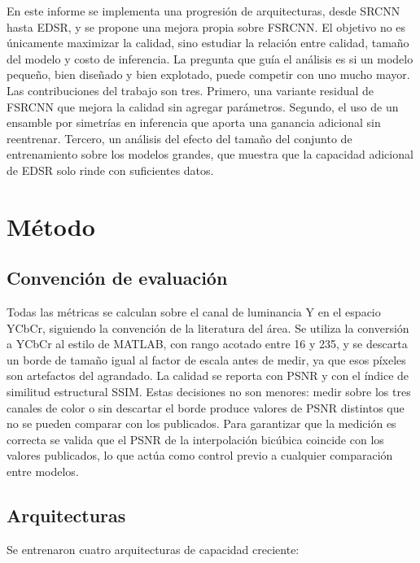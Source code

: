 \documentclass[conference]{IEEEtran}
\begin{document}
En este informe se implementa una progresión de arquitecturas, desde SRCNN hasta EDSR, y se
propone una mejora propia sobre FSRCNN. El objetivo no es únicamente maximizar la calidad, sino
estudiar la relación entre calidad, tamaño del modelo y costo de inferencia. La pregunta que
guía el análisis es si un modelo pequeño, bien diseñado y bien explotado, puede competir con uno
mucho mayor. Las contribuciones del trabajo son tres. Primero, una variante residual de FSRCNN
que mejora la calidad sin agregar parámetros. Segundo, el uso de un ensamble por simetrías en
inferencia que aporta una ganancia adicional sin reentrenar. Tercero, un análisis del efecto del
tamaño del conjunto de entrenamiento sobre los modelos grandes, que muestra que la capacidad
adicional de EDSR solo rinde con suficientes datos.

\section{Método}
\subsection{Convención de evaluación}
Todas las métricas se calculan sobre el canal de luminancia Y en el espacio YCbCr, siguiendo la
convención de la literatura del área. Se utiliza la conversión a YCbCr al estilo de MATLAB, con
rango acotado entre 16 y 235, y se descarta un borde de tamaño igual al factor de escala antes de
medir, ya que esos píxeles son artefactos del agrandado. La calidad se reporta con PSNR y con el
índice de similitud estructural SSIM. Estas decisiones no son menores: medir sobre los tres
canales de color o sin descartar el borde produce valores de PSNR distintos que no se pueden
comparar con los publicados. Para garantizar que la medición es correcta se valida que el PSNR de
la interpolación bicúbica coincide con los valores publicados, lo que actúa como control previo a
cualquier comparación entre modelos.

\subsection{Arquitecturas}
Se entrenaron cuatro arquitecturas de capacidad creciente:
\end{document}
